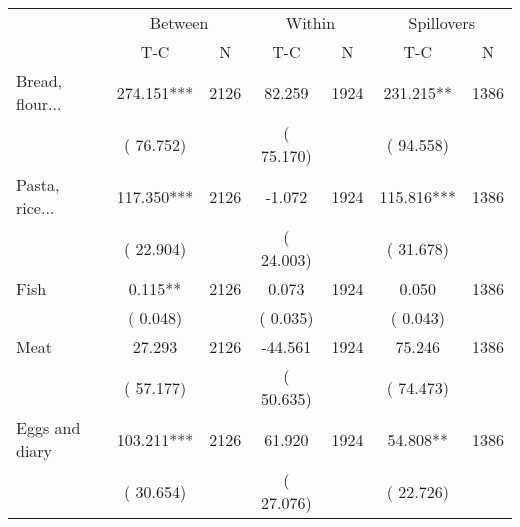 
\begin{tabular}{l*{6}{c}}\hline&\multicolumn{2}{c}{Between}&\multicolumn{2}{c}{Within}&\multicolumn{2}{c}{Spillovers} \\ \cmidrule(r){2-3}\cmidrule(l){4-5}\cmidrule(l){6-7} & {T-C} & {N} & {T-C} & {N}  & {T-C}  & {N}  \\ \midrule
Bread, flour...        &            274.151***      &       2126       &             82.259      &       1924       &            231.215**      &       1386       \\
                       &       (      76.752)            &                               &       (      75.170)            &                               &       (      94.558)            &                               \\
Pasta, rice...        &            117.350***      &       2126       &             -1.072      &       1924       &            115.816***      &       1386       \\
                       &       (      22.904)            &                               &       (      24.003)            &                               &       (      31.678)            &                               \\
Fish        &              0.115**      &       2126       &              0.073      &       1924       &              0.050      &       1386       \\
                       &       (       0.048)            &                               &       (       0.035)            &                               &       (       0.043)            &                               \\
Meat        &             27.293      &       2126       &            -44.561      &       1924       &             75.246      &       1386       \\
                       &       (      57.177)            &                               &       (      50.635)            &                               &       (      74.473)            &                               \\
Eggs and diary        &            103.211***      &       2126       &             61.920      &       1924       &             54.808**      &       1386       \\
                       &       (      30.654)            &                               &       (      27.076)            &                               &       (      22.726)            &                               \\

\end{tabular}
